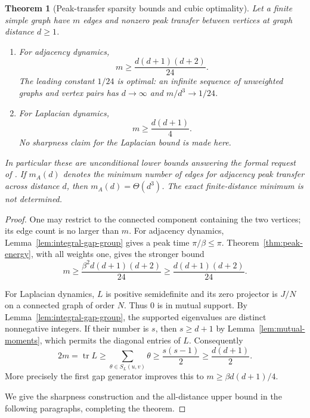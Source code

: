 \documentclass[11pt,a4paper]{article}
\newtheorem{theorem}{Theorem}
\theoremstyle{definition}\newtheorem{definition}[lemma]{Definition}
\theoremstyle{remark}\newtheorem{remark}[lemma]{Remark}
\begin{document}
\begin{theorem}[Peak-transfer sparsity bounds and cubic optimality]
\label{thm:peak-edge-bounds}
Let a finite simple graph have $m$ edges and nonzero peak transfer between
vertices at graph distance $d\geq1$.
\begin{enumerate}
\item For adjacency dynamics,
\begin{equation}\label{eq:adjacency-edge-bound}
 m\geq\frac{d(d+1)(d+2)}{24}.
\end{equation}
The leading constant $1/24$ is optimal: an infinite sequence of unweighted
graphs and vertex pairs has $d\to\infty$ and $m/d^3\to1/24$.
\item For Laplacian dynamics,
\begin{equation}\label{eq:laplacian-edge-bound}
 m\geq\frac{d(d+1)}4.
\end{equation}
No sharpness claim for the Laplacian bound is made here.
\end{enumerate}
In particular these are unconditional lower bounds answering the formal
request of \cite[Open Problem~7.2]{CGS25}. If $m_A(d)$ denotes the minimum
number of edges for adjacency peak transfer across distance $d$, then
$m_A(d)=\Theta(d^3)$. The exact finite-distance minimum is not determined.
\end{theorem}
\begin{proof}
One may restrict to the connected component containing the two vertices;
its edge count is no larger than $m$. For adjacency dynamics,
Lemma~\ref{lem:integral-gap-group} gives a peak time $\pi/\beta\leq\pi$.
Theorem~\ref{thm:peak-energy}, with all weights one, gives the stronger
bound
\[
 m\geq\frac{\beta^2d(d+1)(d+2)}{24}
      \geq\frac{d(d+1)(d+2)}{24}.
\]

For Laplacian dynamics, $L$ is positive semidefinite and its zero
projector is $J/N$ on a connected graph of order $N$. Thus $0$ is in
mutual support. By Lemma~\ref{lem:integral-gap-group}, the supported
eigenvalues are distinct nonnegative integers. If their number is $s$,
then $s\geq d+1$ by Lemma~\ref{lem:mutual-moments}, which permits the
diagonal entries of $L$. Consequently
\[
 2m=\operatorname{tr}L\geq\sum_{\theta\in S_L(u,v)}\theta
       \geq\frac{s(s-1)}2\geq\frac{d(d+1)}2.
\]
More precisely the first gap generator improves this to
$m\geq\beta d(d+1)/4$.

We give the sharpness construction and the all-distance upper bound in
the following paragraphs, completing the theorem.
\end{proof}
\end{document}
